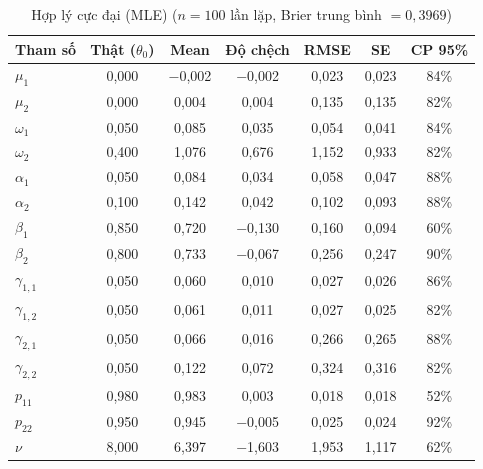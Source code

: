 \documentclass[11pt,a4paper]{article}
\begin{document}
\begin{table}[H]\centering\footnotesize
\caption{Hợp lý cực đại (MLE) ($n=100$ lần lặp, Brier trung bình $=0,3969$)}
\begin{tabularx}{\textwidth}{l C C C C C C}
\toprule
\textbf{Tham số} & \textbf{Thật ($\theta_0$)} & \textbf{Mean} & \textbf{Độ chệch} & \textbf{RMSE} & \textbf{SE} & \textbf{CP 95\%} \\
\midrule
$\mu_1$ & 0,000 & $-$0,002 & $-$0,002 & 0,023 & 0,023 & 84\% \\
$\mu_2$ & 0,000 & 0,004 & 0,004 & 0,135 & 0,135 & 82\% \\
$\omega_1$ & 0,050 & 0,085 & 0,035 & 0,054 & 0,041 & 84\% \\
$\omega_2$ & 0,400 & 1,076 & 0,676 & 1,152 & 0,933 & 82\% \\
$\alpha_1$ & 0,050 & 0,084 & 0,034 & 0,058 & 0,047 & 88\% \\
$\alpha_2$ & 0,100 & 0,142 & 0,042 & 0,102 & 0,093 & 88\% \\
$\beta_1$ & 0,850 & 0,720 & $-$0,130 & 0,160 & 0,094 & 60\% \\
$\beta_2$ & 0,800 & 0,733 & $-$0,067 & 0,256 & 0,247 & 90\% \\
$\gamma_{1,1}$ & 0,050 & 0,060 & 0,010 & 0,027 & 0,026 & 86\% \\
$\gamma_{1,2}$ & 0,050 & 0,061 & 0,011 & 0,027 & 0,025 & 82\% \\
$\gamma_{2,1}$ & 0,050 & 0,066 & 0,016 & 0,266 & 0,265 & 88\% \\
$\gamma_{2,2}$ & 0,050 & 0,122 & 0,072 & 0,324 & 0,316 & 82\% \\
$p_{11}$ & 0,980 & 0,983 & 0,003 & 0,018 & 0,018 & 52\% \\
$p_{22}$ & 0,950 & 0,945 & $-$0,005 & 0,025 & 0,024 & 92\% \\
$\nu$ & 8,000 & 6,397 & $-$1,603 & 1,953 & 1,117 & 62\% \\
\bottomrule
\end{tabularx}
\end{table}
\end{document}
